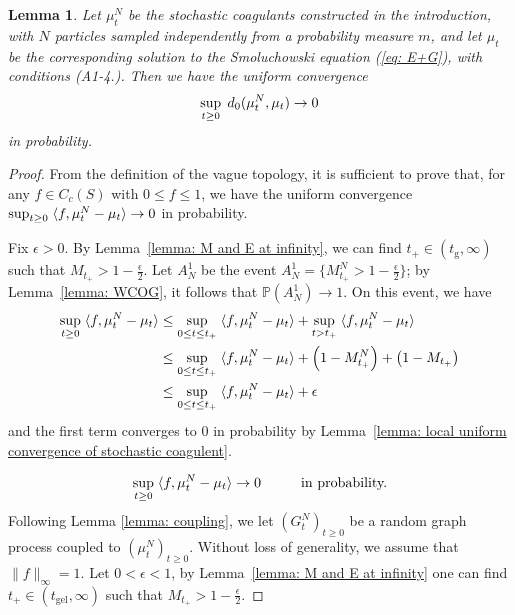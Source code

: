 \documentclass[11pt, notitlepage]{article}
\newtheorem{lem}[thm]{Lemma}
\begin{document}
\begin{lem} \label{lemma: uniform convergence of coagulant} Let $\mu^N_t$ be the stochastic coagulants constructed in the introduction, with $N$ particles sampled independently from a probability measure $m$, and let $\mu_t$ be the corresponding solution to the Smoluchowski equation (\ref{eq: E+G}), with conditions (A1-4.). Then we have the \emph{uniform} convergence \begin{equation} \sup_{t\ge 0} \hspace{0.1cm} d_0(\mu^N_t, \mu_t) \rightarrow 0\end{equation} in probability.  \end{lem} 
\begin{proof} 

From the definition of the vague topology, it is sufficient to prove that, for any $f\in C_c(S)$ with $0\leq f \leq 1$, we have the uniform convergence
$\sup_{t\geq 0}\hspace{0.1cm} \langle f, \mu^N_t-\mu_t \rangle \rightarrow 0$ in probability.

Fix $\epsilon>0$. By Lemma~\ref{lemma: M and E at infinity}, we can find $t_+\in (t_\text{g}, \infty)$ such that $M_{t_+}>1-\frac{\epsilon}{2}.$
Let $A^1_N$ be the event $A^1_N=\{M^N_{t_+}>1-\frac{\epsilon}{2} \}$; by Lemma~\ref{lemma: WCOG}, it follows that $\mathbb{P}(A^1_N)\rightarrow 1$.
On this event, we have
\begin{equation} \begin{split}
\sup_{t\geq 0}\hspace{0.1cm} \langle f, \mu^N_t-\mu_t \rangle
&\leq
\sup_{0 \leq t \leq t_+}\hspace{0.1cm} \langle f, \mu^N_t-\mu_t \rangle + \sup_{t >t_+}\hspace{0.1cm} \langle f, \mu^N_t-\mu_t \rangle \\ &
\leq
\sup_{0 \leq t \leq t_+}\hspace{0.1cm} \langle f, \mu^N_t-\mu_t \rangle + \left(1 - M_{t_+}^N\right) + \left(1 - M_{t_+}\right)
\\ & \leq
\sup_{0 \leq t \leq t_+}\hspace{0.1cm} \langle f, \mu^N_t-\mu_t \rangle + \epsilon
\end{split} \end{equation}
and the first term converges to $0$ in probability by Lemma~\ref{lemma: local uniform convergence of stochastic coagulent}.

\iffalse
\begin{equation}
    \sup_{t\geq 0}\hspace{0.1cm} \langle f, \mu^N_t-\mu_t \rangle \rightarrow 0 \hspace{1cm} \text{in probability.}
\end{equation} Following Lemma \ref{lemma: coupling}, we let $(G^N_t)_{t\ge 0}$ be a random graph process coupled to $(\mu^N_t)_{t\ge 0}$. Without loss of generality, we assume that $\|f\|_\infty=1.$
Let $0<\epsilon<1$, by Lemma~\ref{lemma: M and E at infinity} one can find $t_+\in (t_\text{gel}, \infty)$ such that $M_{t_+}>1-\frac{\epsilon}{2}.$


\end{proof}
\end{document}
